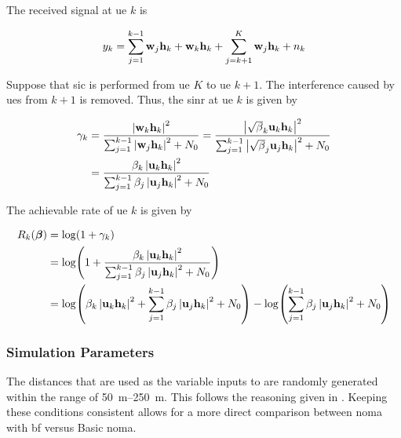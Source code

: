 \par
The received signal at \ac{ue} $k$ is

\begin{equation}
	y_k = \sum_{j=1}^{k-1} \mathbf{w}_j \mathbf{h}_k + \mathbf{w}_k \mathbf{h}_k + \sum_{j=k+1}^K \mathbf{w}_j \mathbf{h}_k + n_k
\end{equation}

\par
Suppose that \ac{sic} is performed from \ac{ue} $K$ to \ac{ue} $k+1$.
The interference caused by \acp{ue} from $k+1$ is removed.
Thus, the \ac{sinr} at \ac{ue} $k$ is given by

\begin{align}
	\gamma_k 
	& = \frac{\left| \mathbf{w}_k \mathbf{h}_k \right|^2}{\sum_{j=1}^{k-1} \left| \mathbf{w}_j \mathbf{h}_k \right|^2 + N_0}
	= \frac{\left| \sqrt{\beta}_{k} \mathbf{u}_k \mathbf{h}_k \right|^2}{ \sum_{j=1}^{k-1} \left| \sqrt{\beta}_{j}\mathbf{u}_j \mathbf{h}_k \right|^2 + N_0} \\
	& = \frac{\beta_k \left|\mathbf{u}_k \mathbf{h}_k \right|^2}{\sum_{j=1}^{k-1} \beta_{j} \left| \mathbf{u}_j \mathbf{h}_k \right|^2 + N_0}
\end{align}

\par
The achievable rate of \ac{ue} $ k $ is given by

\vspace{-2em}

\begin{align}
	R_{k}(\boldsymbol{\beta}) 
	& = \log (1+\gamma_k) \\
	& = \log (1 + \frac{\beta_k \left|\mathbf{u}_k \mathbf{h}_k \right|^2}{\sum_{j=1}^{k-1} \beta_{j} \left| \mathbf{u}_j \mathbf{h}_k \right|^2 + N_0}) \label{eq:bfrate} \\
	& = \log ({\beta}_k \left| \mathbf{u}_k \mathbf{h}_k \right|^2 
	+ \sum_{j=1}^{k-1} \beta_{j} \left| \mathbf{u}_j \mathbf{h}_k \right|^2 + N_0)
	- \log(\sum_{j=1}^{k-1} \beta_{j} \left| \mathbf{u}_j \mathbf{h}_k \right|^2 + N_0) \label{eq:bfratelong}
\end{align}

\subsubsection{Simulation Parameters}
\label{sec:simpar}
The distances that are used as the variable inputs to  are randomly generated within the range of \SIrange{50}{250}{\metre}.
This follows the reasoning given in .
Keeping these conditions consistent allows for a more direct comparison between \ac{noma} with \ac{bf} versus Basic \ac{noma}.

